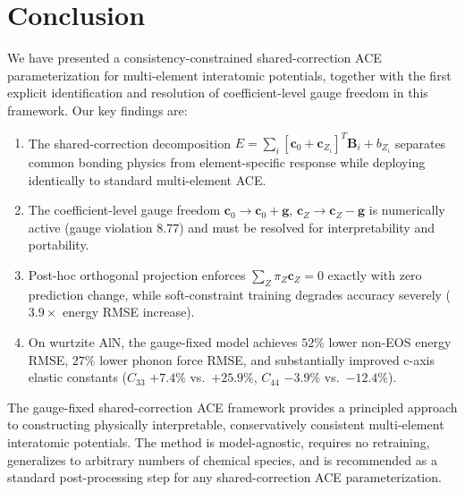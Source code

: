 \documentclass[twoside,prb,aps,floatfix,superscriptaddress,longbibliography]{revtex4-2}
\begin{document}
\section{Conclusion}
\label{sec:conclusion}

We have presented a consistency-constrained shared-correction ACE parameterization for multi-element interatomic potentials, together with the first explicit identification and resolution of coefficient-level gauge freedom in this framework. Our key findings are:

\begin{enumerate}[label=\textbf{(F\arabic*)}]
    \item The shared-correction decomposition $E = \sum_i [\mathbf{c}_0 + \mathbf{c}_{Z_i}]^T \mathbf{B}_i + b_{Z_i}$ separates common bonding physics from element-specific response while deploying identically to standard multi-element ACE.
    \item The coefficient-level gauge freedom $\mathbf{c}_0 \to \mathbf{c}_0 + \mathbf{g}$, $\mathbf{c}_Z \to \mathbf{c}_Z - \mathbf{g}$ is numerically active (gauge violation $8.77$) and must be resolved for interpretability and portability.
    \item Post-hoc orthogonal projection enforces $\sum_Z \pi_Z \mathbf{c}_Z = 0$ exactly with zero prediction change, while soft-constraint training degrades accuracy severely ($3.9\times$ energy RMSE increase).
    \item On wurtzite AlN, the gauge-fixed model achieves $52\%$ lower non-EOS energy RMSE, $27\%$ lower phonon force RMSE, and substantially improved c-axis elastic constants ($C_{33}$ $+7.4\%$ vs.\ $+25.9\%$, $C_{44}$ $-3.9\%$ vs.\ $-12.4\%$).
\end{enumerate}

The gauge-fixed shared-correction ACE framework provides a principled approach to constructing physically interpretable, conservatively consistent multi-element interatomic potentials. The method is model-agnostic, requires no retraining, generalizes to arbitrary numbers of chemical species, and is recommended as a standard post-processing step for any shared-correction ACE parameterization.

\begin{acknowledgments}
\end{acknowledgments}
\end{document}
